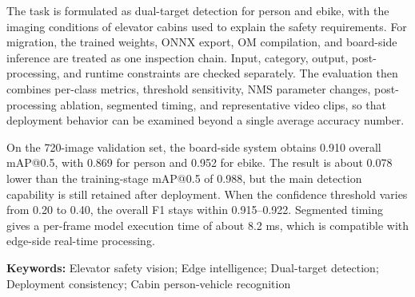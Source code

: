 \documentclass{ctexbook}
\begin{document}
The task is formulated as dual-target detection for person and ebike, with the imaging conditions of elevator cabins used to explain the safety requirements. For migration, the trained weights, ONNX export, OM compilation, and board-side inference are treated as one inspection chain. Input, category, output, post-processing, and runtime constraints are checked separately. The evaluation then combines per-class metrics, threshold sensitivity, NMS parameter changes, post-processing ablation, segmented timing, and representative video clips, so that deployment behavior can be examined beyond a single average accuracy number.

On the 720-image validation set, the board-side system obtains 0.910 overall mAP@0.5, with 0.869 for person and 0.952 for ebike. The result is about 0.078 lower than the training-stage mAP@0.5 of 0.988, but the main detection capability is still retained after deployment. When the confidence threshold varies from 0.20 to 0.40, the overall F1 stays within 0.915--0.922. Segmented timing gives a per-frame model execution time of about 8.2 ms, which is compatible with edge-side real-time processing.

\noindent\textbf{Keywords: }Elevator safety vision; Edge intelligence; Dual-target detection; Deployment consistency; Cabin person-vehicle recognition
\end{document}
